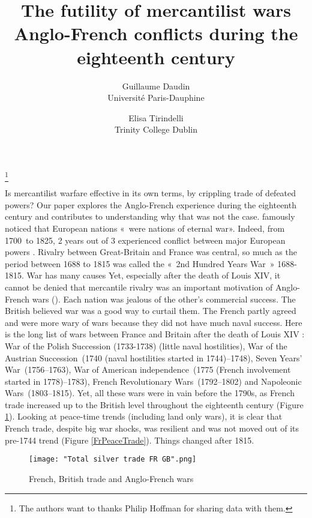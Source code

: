 \documentclass[12pt,a4paper,titlepage,english]{article}
\author{
  Guillaume Daudin \\ Université Paris-Dauphine
  \and
  Elisa Tirindelli \\ Trinity College Dublin 
}
\title{The futility of mercantilist wars \\ Anglo-French conflicts during the eighteenth century}
\begin{document}
\thanks{The authors want to thanks Philip Hoffman for sharing data with them.}

\maketitle
Is mercantilist warfare effective in its own terms, by crippling trade of defeated powers? Our paper explores the Anglo-French experience during the eighteenth century and contributes to understanding why that was not the case.
\cite{jefferson_letter_1823} famously noticed that European nations « were nations of eternal war». Indeed, from 1700 to 1825, 2 years out of 3 experienced conflict between major European powers \cite{roser_war_2016}. Rivalry between Great-Britain and France was central, so much as the period between 1688 to 1815 was called the « 2nd Hundred Years War » 1688-1815. War has many causes Yet, especially after the death of Louis XIV, it cannot be denied that mercantile rivalry was an important motivation of Anglo-French wars (\cite{wallerstein_modern_1980, crouzet_guerre_2008}). Each nation was jealous of the other’s commercial success. The British believed war was a good way to curtail them. The French partly agreed and were more wary of wars because they did not have much naval success. 
Here is the long list of wars between France and Britain after the death of Louis XIV : War of the Polish Succession (1733-1738) (little naval hostilities), War of the Austrian Succession (1740 (naval hostilities started in 1744)–1748), Seven Years' War (1756–1763), War of American independence (1775 (French involvement started in 1778)–1783), French Revolutionary Wars (1792–1802) and Napoleonic Wars (1803–1815). Yet, all these wars were in vain before the 1790s, as French trade increased up to the British level throughout the eighteenth century (Figure \ref{FrBritTrade}).
Looking at peace-time trends (including land only wars), it is clear that French trade, despite big war shocks, was resilient and was not moved out of its pre-1744 trend (Figure \ref{FrPeaceTrade}). Things changed after 1815.

\begin{figure}
\caption{French, British trade and Anglo-French wars}
\centering
\texttt{[image: "Total silver trade FR GB".png]}
\label{FrBritTrade}
\end{figure}
\end{document}
